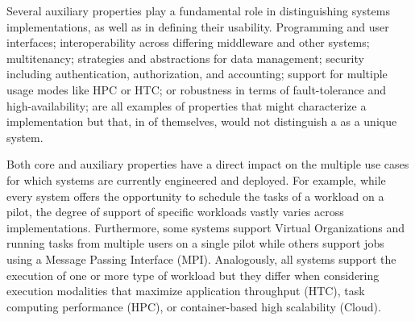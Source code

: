 \documentclass{sig-alternate}
\begin{document}
Several auxiliary properties play a fundamental role in distinguishing \pilot
systems implementations, as well as in defining their usability. Programming and
user interfaces; interoperability across differing middleware and other \pilot
systems; multitenancy; strategies and abstractions for data management; security
including authentication, authorization, and accounting; support for multiple
usage modes like HPC or HTC; or robustness in terms of fault-tolerance and
high-availability; are all examples of properties that might characterize a
\pilot implementation but that, in of themselves, would not distinguish a \pilot
as a unique system.

Both core and auxiliary properties have a direct impact on the multiple use
cases for which \pilot systems are currently engineered and deployed. For
example, while every \pilot system offers the opportunity to schedule the tasks
of a workload on a pilot, the degree of support of specific workloads vastly
varies across implementations. Furthermore, some \pilot systems support Virtual
Organizations and running tasks from multiple users on a single pilot while
others support jobs using a Message Passing Interface (MPI). Analogously, all
\pilot systems support the execution of one or more type of workload but they
differ when considering execution modalities that maximize application
throughput (HTC), task computing performance (HPC), or container-based high
scalability (Cloud).
\end{document}
